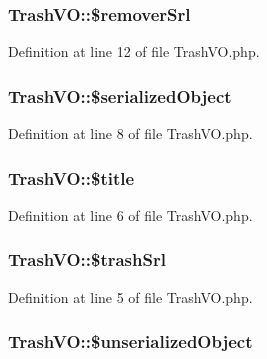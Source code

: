 \subsubsection[{\$remover\+Srl}]{\setlength{\rightskip}{0pt plus 5cm}Trash\+V\+O\+::\$remover\+Srl}\label{classTrashVO_aa51410763a3b44a76853d8a347793903}


Definition at line 12 of file Trash\+V\+O.\+php.

\hypertarget{classTrashVO_ac3834ed43d01357398d5a0d7f5a9c698}{}
\subsubsection[{\$serialized\+Object}]{\setlength{\rightskip}{0pt plus 5cm}Trash\+V\+O\+::\$serialized\+Object}\label{classTrashVO_ac3834ed43d01357398d5a0d7f5a9c698}


Definition at line 8 of file Trash\+V\+O.\+php.

\hypertarget{classTrashVO_ac6f85be76ea94f3fde44e0527bdcadc1}{}
\subsubsection[{\$title}]{\setlength{\rightskip}{0pt plus 5cm}Trash\+V\+O\+::\$title}\label{classTrashVO_ac6f85be76ea94f3fde44e0527bdcadc1}


Definition at line 6 of file Trash\+V\+O.\+php.

\hypertarget{classTrashVO_a8aeea2d547b7a335d987bcf4369a969c}{}
\subsubsection[{\$trash\+Srl}]{\setlength{\rightskip}{0pt plus 5cm}Trash\+V\+O\+::\$trash\+Srl}\label{classTrashVO_a8aeea2d547b7a335d987bcf4369a969c}


Definition at line 5 of file Trash\+V\+O.\+php.

\hypertarget{classTrashVO_a43048c60bc9505999742be271b5d9385}{}
\subsubsection[{\$unserialized\+Object}]{\setlength{\rightskip}{0pt plus 5cm}Trash\+V\+O\+::\$unserialized\+Object}\label{classTrashVO_a43048c60bc9505999742be271b5d9385}


